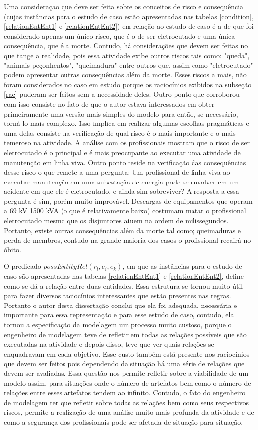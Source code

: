 Uma consideraçao que deve ser feita sobre os conceitos de risco e consequência (cujas instâncias para o estudo de caso estão apresentadas nas tabelas \ref{condition}, \ref{relationEntEnt1} e \ref{relationEntEnt2}) em relação ao estudo de caso é a de que foi considerado apenas um único risco, que é o de ser eletrocutado e uma única consequência, que é a morte. Contudo, há considerações que devem ser feitas no que tange a realidade, pois essa atividade exibe outros riscos tais como: "queda", "animais peçonhentos", "queimadura" entre outros que, assim como "eletrocutado" podem apresentar outras consequências além da morte. Esses riscos a mais, não foram considerados no caso em estudo porque os raciocínios exibidos na subseção \ref{rac} puderam ser feitos sem a necessidade deles. Outro ponto que corroborou com isso consiste no fato de que o autor estava interessados em obter primeiramente uma versão mais simples do modelo para então, se necessário, torná-lo mais complexo. Isso implica em realizar algumas escolhas pragmáticas e uma delas consiste na verificação de qual risco é o mais importante e o mais temeroso na atividade. A análise com os profissionais mostram que o risco de ser eletrocutado é o principal e é mais preocupante ao executar uma atividade de manutenção em linha viva. Outro ponto reside na verificação das consequências desse risco o que remete a uma pergunta; Um profissional de linha viva ao executar manutenção em uma subestação de energia pode se envolver em um acidente em que ele é eletrocutado, e ainda sim sobreviver? A resposta a essa pergunta é sim, porém muito improvável. Descargas de equipamentos que operam a 69 kV 1500 kVA  (o que é relativamente baixo) costumam matar o profissional eletrocutado mesmo que os disjuntores atuem na ordem de milissegundos. Portanto, existe outras consequências além da morte tal como; queimaduras e perda de membros, contudo na grande maioria dos casos o profissional recairá no óbito. 

O predicado $possEntityRel(r_l,e_i,e_k)$, em que as instâncias para o estudo de caso são apresentadas nas tabelas \ref{relationEntEnt1} e \ref{relationEntEnt2}, define como se dá a relação entre duas entidades. Essa estrutura se tornou muito útil para fazer diversos raciocínios interessantes que estão presentes nas regras. Portanto o autor desta dissertação conclui que ela foi adequada, necessária e importante para essa representação e para esse estudo de caso, contudo, ela tornou a especificação da modelagem um processo muito custoso, porque o engenheiro de modelagem teve de refletir em todas as relações possíveis que são executadas na atividade e depois disso, teve que ver quais relações se enquadravam em cada objetivo. Esse custo também está presente nos raciocínios que devem ser feitos pois dependendo da situação há uma série de relações que devem ser avaliadas. Essa questão nos permite refletir sobre a viabilidade de um modelo assim, para situações onde o número de artefatos bem como o número de relações entre esses artefatos tendem ao infinito. Contudo, o fato do engenheiro de modelagem ter que refletir sobre todas as relações bem como seus respectivos riscos, permite a realização de uma análise muito mais profunda da atividade e de como a segurança dos profissionais pode ser afetada de situação para situação. 


